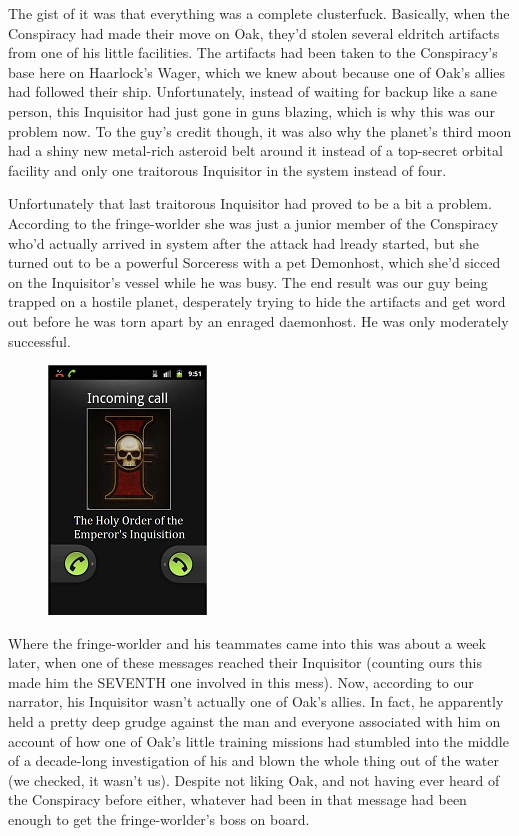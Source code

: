 The gist of it was that everything was a complete clusterfuck. 
Basically, when the Conspiracy had made their move on Oak, they'd stolen several eldritch artifacts from one of his little facilities. 
The artifacts had been taken to the Conspiracy's base here on Haarlock's Wager, which we knew about because one of Oak's allies had followed their ship. 
Unfortunately, instead of waiting for backup like a sane person, this Inquisitor had just gone in guns blazing, which is why this was our problem now. 
To the guy's credit though, it was also why the planet's third moon had a shiny new metal-rich asteroid belt around it instead of a top-secret orbital facility and only one traitorous Inquisitor in the system instead of four. 


Unfortunately that last traitorous Inquisitor had proved to be a bit a problem. 
According to the fringe-worlder she was just a junior member of the Conspiracy who'd actually arrived in system after the attack had lready started, but she turned out to be a powerful Sorceress with a pet Demonhost, which she'd sicced on the Inquisitor's vessel while he was busy. 
The end result was our guy being trapped on a hostile planet, desperately trying to hide the artifacts and get word out before he was torn apart by an enraged daemonhost. 
He was only moderately successful.

\begin{figure}
	\begin{center}
		\includegraphics[width=\figwidth]{pics/18/40.png}
	\end{center}
\end{figure}
Where the fringe-worlder and his teammates came into this was about a week later, when one of these messages reached their Inquisitor (counting ours this made him the SEVENTH one involved in this mess). 
Now, according to our narrator, his Inquisitor wasn't actually one of Oak's allies. 
In fact, he apparently held a pretty deep grudge against the man and everyone associated with him on account of how one of Oak's little training missions had stumbled into the middle of a decade-long investigation of his and blown the whole thing out of the water (we checked, it wasn't us). 
Despite not liking Oak, and not having ever heard of the Conspiracy before either, whatever had been in that message had been enough to get the fringe-worlder's boss on board. 


